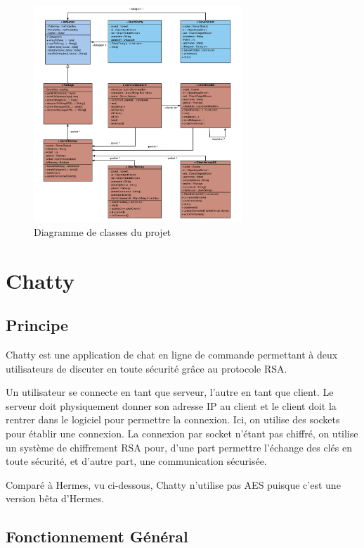 \documentclass{article}
\begin{document}
\begin{figure}[h]
    \centering
    \includegraphics[width=0.7\textwidth]{class_diagramm.png}
    \caption{Diagramme de classes du projet}
\end{figure}

\section{Chatty}

\subsection{Principe}

Chatty est une application de chat en ligne de commande permettant à deux utilisateurs de discuter en toute sécurité grâce au protocole RSA. 

Un utilisateur se connecte en tant que serveur, l'autre en tant que client. 
Le serveur doit physiquement donner son adresse IP au client et le client doit la rentrer dans le logiciel pour 
permettre la connexion. Ici, on utilise des sockets pour établir une connexion. La connexion par socket n'étant pas chiffré, 
on utilise un système de chiffrement RSA pour, d'une part permettre l'échange des clés en toute sécurité, et d'autre part, 
une communication sécurisée. 

Comparé à Hermes, vu ci-dessous, Chatty n'utilise pas AES puisque c'est une version bêta d'Hermes. 

\subsection{Fonctionnement Général}
\end{document}

